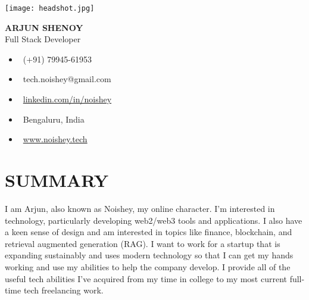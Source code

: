 \documentclass[11pt,a4paper]{article}
\begin{document}
\pagestyle{plain}

\begin{tcolorbox}[
    colback=primarygreen,
    coltext=white,
    boxrule=0pt,
    arc=0pt,
    left=0pt,
    right=0pt,
    top=0pt,
    bottom=0pt,
    width=\textwidth
]
\begin{center}
\vspace{0.5cm}

\begin{minipage}{0.25\textwidth}
\centering
\texttt{[image: headshot.jpg]}
\end{minipage}
\begin{minipage}{0.7\textwidth}
\raggedright

{\Huge\textbf{ARJUN SHENOY}}\\[0.3cm]
{\Large Full Stack Developer}\\[0.5cm]

\begin{multicols}{2}
\begin{itemize}[leftmargin=*]
    \item \faPhone\ (+91) 79945-61953
    \item \faEnvelope\ tech.noishey@gmail.com
    \item \faLinkedin\ \href{https://linkedin.com/in/noishey}{linkedin.com/in/noishey}
    \item \faMapMarker\ Bengaluru, India
    \item \faGlobe\ \href{https://www.noishey.tech}{www.noishey.tech}
\end{itemize}
\end{multicols}

\end{minipage}
\end{center}
\vspace{0.5cm}
\end{tcolorbox}

\vspace{0.5cm}

\section{SUMMARY}
I am Arjun, also known as Noishey, my online character. I'm interested in technology, particularly developing web2/web3 tools and applications. I also have a keen sense of design and am interested in topics like finance, blockchain, and retrieval augmented generation (RAG). I want to work for a startup that is expanding sustainably and uses modern technology so that I can get my hands working and use my abilities to help the company develop. I provide all of the useful tech abilities I've acquired from my time in college to my most current full-time tech freelancing work.
\end{document}

